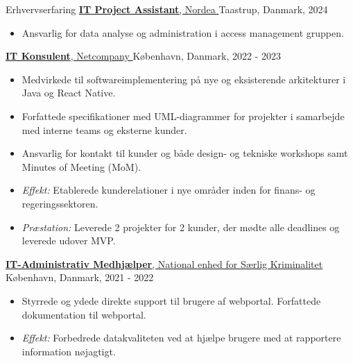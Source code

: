 \documentclass{resume}
\begin{document}
\begin{rSection}{Erhvervserfaring}
    \href{https://www.nordea.dk}{
        \textbf{IT Project Assistant}, Nordea
    }
    \hfill
    Taastrup, Danmark, 2024
    \begin{itemize}
        \item Ansvarlig for data analyse og administration i access management gruppen.
    \end{itemize}

    \href{https://netcompany.com}{
        \textbf{IT Konsulent}, Netcompany
    }
    \hfill
    København, Danmark, 2022 - 2023
    \begin{itemize}
        \item Medvirkede til softwareimplementering på nye og eksisterende arkitekturer i Java og React Native.
        \item Forfattede specifikationer med UML-diagrammer for projekter i samarbejde med interne teams og eksterne kunder.
        \item Ansvarlig for kontakt til kunder og både design- og tekniske workshops samt Minutes of Meeting (MoM).
        \item \textit{Effekt:} Etablerede kunderelationer i nye områder inden for finans- og regeringssektoren.
        \item \textit{Præstation:} Leverede 2 projekter for 2 kunder, der mødte alle deadlines og leverede udover MVP.
    \end{itemize}

    \href{https://politi.dk/virksomheden/national-enhed-for-saerlig-kriminalitet}{
        \textbf{IT-Administrativ Medhjælper}, National enhed for Særlig Kriminalitet
    }
    \hfill
    København, Danmark, 2021 - 2022
    \begin{itemize}
        \item Styrrede og ydede direkte support til brugere af webportal. Forfattede dokumentation til webportal.
        \item \textit{Effekt:} Forbedrede datakvaliteten ved at hjælpe brugere med at rapportere information nøjagtigt.
    \end{itemize}


\end{rSection}
\end{document}
